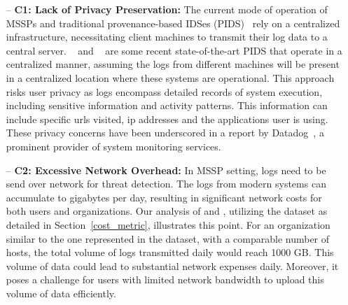 \begin{itemize} [leftmargin=*]
    \item[--] \textbf{C1: Lack of Privacy Preservation:} The current mode of operation of MSSPs and traditional provenance-based IDSes (PIDS)~\cite{flash2024,cheng2023kairos,wang2022threatrace} rely on a centralized infrastructure, necessitating client machines to transmit their log data to a central server. \flash~\cite{flash2024} and \kairos~\cite{cheng2023kairos} are some recent state-of-the-art PIDS that operate in a centralized manner, assuming the \logs logs from different machines will be present in a centralized location where these systems are operational. This approach risks user privacy as \logs logs encompass detailed records of system execution, including sensitive information and activity patterns. This information can include specific urls visited, ip addresses and the applications user is using. These privacy concerns have been underscored in a report by Datadog~\cite{datadog}, a prominent provider of system monitoring services.
    
    \item[--] \textbf{C2: Excessive Network Overhead:} In MSSP setting, \logs logs need to be send over network for threat detection. The logs from modern systems can accumulate to gigabytes per day, resulting in significant network costs for both users and organizations. Our analysis of \flash and \kairos, utilizing the \optc dataset as detailed in Section~\ref{cost_metric}, illustrates this point. For an organization similar to the one represented in the \optc dataset, with a comparable number of hosts, the total volume of logs transmitted daily would reach 1000 GB. This volume of data could lead to substantial network expenses daily. Moreover, it poses a challenge for users with limited network bandwidth to upload this volume of data efficiently.
    
    

\end{itemize}
